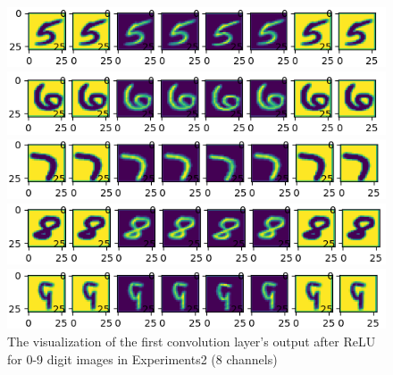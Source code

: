 \documentclass{elegantbook}
\begin{document}
\begin{figure}[!h]
\begin{minipage}[t]{0.98\textwidth}
	\end{minipage}
	\begin{minipage}[t]{0.98\textwidth}
		\centering
		\includegraphics[width=\textwidth]{../results/05}
	\end{minipage}
	\begin{minipage}[t]{0.98\textwidth}
		\centering
		\includegraphics[width=\textwidth]{../results/06}
	\end{minipage}
	\begin{minipage}[t]{0.98\textwidth}
		\centering
		\includegraphics[width=\textwidth]{../results/07}
	\end{minipage}
	\begin{minipage}[t]{0.98\textwidth}
		\centering
		\includegraphics[width=\textwidth]{../results/08}
	\end{minipage}
	\begin{minipage}[t]{0.98\textwidth}
		\centering
		\includegraphics[width=\textwidth]{../results/09}
	\end{minipage}
	\caption{\label{visualization}The visualization of the first convolution layer's output after ReLU for 0-9 digit images in Experiments2 (8 channels)}
\end{figure}
\end{document}
